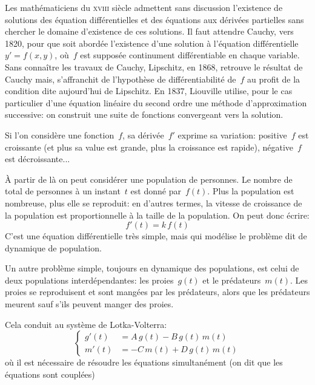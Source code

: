 \medskip
Les mathématiciens du \textsc{xviii} siècle admettent sans discussion l'existence de solutions des équation différentielles et des équations aux dérivées partielles sans chercher le domaine d'existence de ces solutions. Il faut attendre Cauchy, vers 1820, pour que soit abordée l'existence d'une solution à l'équation différentielle~$y' = f(x,y)$, où~$f$ est supposée continument différentiable en chaque variable. Sans connaître les travaux de Cauchy, Lipschitz, en 1868, retrouve le résultat de Cauchy mais, s'affranchit de l'hypothèse de différentiabilité de~$f$ au profit de la condition dite aujourd'hui de Lipschitz. En 1837, Liouville utilise, pour le cas particulier d'une équation linéaire du second ordre une méthode d'approximation successive: on construit une suite de fonctions convergeant vers la solution.


\medskip
Si l'on considère une fonction~$f$, sa dérivée~$f'$ exprime sa variation: positive~$f$ est croissante (et plus sa value est grande, plus la croissance est rapide), négative~$f$ est décroissante...

À partir de là on peut considérer une population de personnes. Le nombre de total de personnes à un instant~$t$ est donné par~$f(t)$. Plus la population est nombreuse, plus elle se reproduit: en d'autres termes, la vitesse de croissance de la population est proportionnelle à la taille de la population. On peut donc écrire:
\begin{equation}
f'(t)=k\,f(t)\end{equation}
C'est une équation différentielle très simple, mais qui modélise le problème dit de dynamique de population.

\medskip
Un autre problème simple, toujours en dynamique des populations, est celui de deux populations interdépendantes: les proies~$g(t)$ et le prédateurs~$m(t)$. Les proies se reproduisent et sont mangées par les prédateurs, alors que les prédateurs meurent sauf s'ils peuvent manger des proies.

Cela conduit au système de Lotka-Volterra:
\begin{equation}%
  \begin{cases} g'(t)&=A\,g(t)-B\,g(t)\,m(t) \\ m'(t)&=-C\,m(t)+D\,g(t)\,m(t) \end{cases} 
\end{equation}
où il est nécessaire de résoudre les équations simultanément (on dit que les équations sont couplées)

